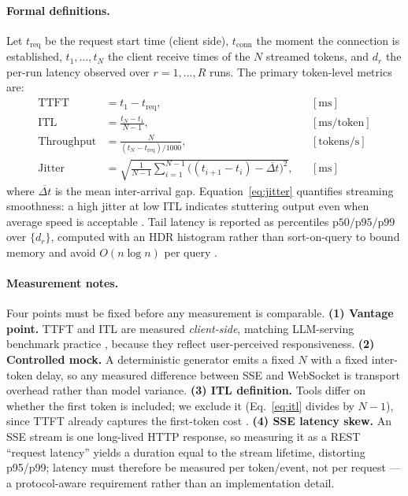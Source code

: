 \documentclass[11pt]{article}
\begin{document}
\paragraph{Formal definitions.} Let $t_{\text{req}}$ be the request start time (client side), $t_{\text{conn}}$ the moment the connection is established, $t_1,\dots,t_N$ the client receive times of the $N$ streamed tokens, and $d_r$ the per-run latency observed over $r=1,\dots,R$ runs. The primary token-level metrics are:
\begin{align}
\text{TTFT} &= t_1 - t_{\text{req}}, &&[\text{ms}] \label{eq:ttft}\\
\text{ITL}  &= \frac{t_N - t_1}{N-1}, &&[\text{ms/token}] \label{eq:itl}\\
\text{Throughput} &= \frac{N}{(t_N - t_{\text{req}})/1000}, &&[\text{tokens/s}] \label{eq:tps}\\
\text{Jitter} &= \sqrt{\frac{1}{N-1}\sum_{i=1}^{N-1}\big((t_{i+1}-t_i) - \overline{\Delta t}\big)^2}, &&[\text{ms}] \label{eq:jitter}
\end{align}
where $\overline{\Delta t}$ is the mean inter-arrival gap. Equation~\eqref{eq:jitter} quantifies streaming smoothness: a high jitter at low ITL indicates stuttering output even when average speed is acceptable \cite{arxivserving2025}. Tail latency is reported as percentiles $\mathrm{p50/p95/p99}$ over $\{d_r\}$, computed with an HDR histogram rather than sort-on-query to bound memory and avoid $O(n\log n)$ per query \cite{micrometer2026,prometheushist2026}.

\paragraph{Measurement notes.} Four points must be fixed before any measurement is comparable.
\textbf{(1) Vantage point.} TTFT and ITL are measured \emph{client-side}, matching LLM-serving benchmark practice \cite{arxivserving2025,chiron2025}, because they reflect user-perceived responsiveness.
\textbf{(2) Controlled mock.} A deterministic generator emits a fixed $N$ with a fixed inter-token delay, so any measured difference between SSE and WebSocket is transport overhead rather than model variance.
\textbf{(3) ITL definition.} Tools differ on whether the first token is included; we exclude it (Eq.~\eqref{eq:itl} divides by $N-1$), since TTFT already captures the first-token cost \cite{arxivserving2025,chiron2025}.
\textbf{(4) SSE latency skew.} An SSE stream is one long-lived HTTP response, so measuring it as a REST ``request latency'' yields a duration equal to the stream lifetime, distorting p95/p99; latency must therefore be measured per token/event, not per request --- a protocol-aware requirement rather than an implementation detail.
\end{document}
